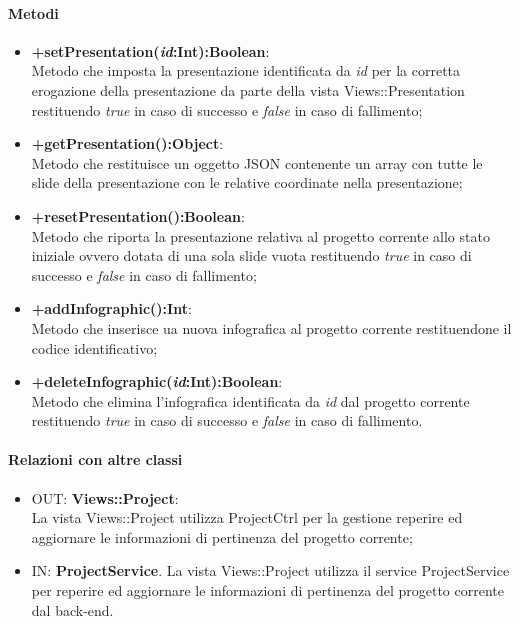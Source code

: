 	\paragraph{Metodi}
	\begin{itemize}
	  	\item \textbf{+setPresentation(\textit{id}:Int):Boolean}:\\
		  	Metodo che imposta la presentazione identificata da  \textit{id} per la corretta erogazione della presentazione da parte della vista Views::Presentation restituendo \textit{true} in caso di successo e \textit{false} in caso di fallimento;
	  	\item \textbf{+getPresentation():Object}:\\
		  	Metodo che restituisce un oggetto JSON contenente un array con tutte le slide della presentazione con le relative coordinate nella presentazione;
	 	\item \textbf{+resetPresentation():Boolean}:\\
			Metodo che riporta la presentazione relativa al progetto corrente allo stato iniziale ovvero dotata di una sola slide vuota restituendo \textit{true} in caso di successo e \textit{false} in caso di fallimento;
		\item \textbf{+addInfographic():Int}:\\
			Metodo che inserisce ua nuova infografica al progetto corrente restituendone il codice identificativo;
		\item \textbf{+deleteInfographic(\textit{id}:Int):Boolean}:\\
	  		Metodo che elimina l'infografica identificata da \textit{id} dal progetto corrente restituendo \textit{true} in caso di successo e \textit{false} in caso di fallimento.
		
		  
	\end{itemize}
	\paragraph{Relazioni con altre classi}
	\begin{itemize}
	  \item OUT: \textbf{Views::Project}:\\
		La vista Views::Project utilizza ProjectCtrl per la gestione reperire ed aggiornare le informazioni di pertinenza del progetto corrente;	
	  \item IN: \textbf{ProjectService}.
		La vista Views::Project utilizza il service ProjectService per reperire ed aggiornare le informazioni di pertinenza del progetto corrente dal back-end.
	\end{itemize}

